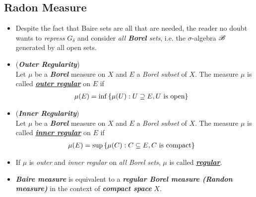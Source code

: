 \documentclass[11pt]{article}
\begin{document}
\subsection{Radon Measure}
\begin{itemize}
\item \begin{remark}
Despite the fact that Baire sets are all that are needed, the reader no doubt  wants to \emph{repress} $G_{\delta}$ and consider \emph{all \textbf{Borel} sets}, i.e. the $\sigma$-algebra ${\mathscr B}$ generated by  all open sets. 
\end{remark}

\item \begin{definition} (\emph{\textbf{Outer Regularity}}) \citep{folland2013real} \\
Let $\mu$ be a \textbf{\emph{Borel}} measure on $X$ and $E$ a \emph{Borel subset} of $X$. The measure $\mu$ is called \underline{\textbf{\emph{outer regular}}} on $E$  if
\begin{align*}
\mu(E) &= \inf\left\{\mu(U): U \supseteq E, U \text{ is open}\right\}
\end{align*}
\end{definition}

\item \begin{definition} (\emph{\textbf{Inner Regularity}}) \citep{folland2013real} \\
Let $\mu$ be a \textbf{\emph{Borel}} measure on $X$ and $E$ a \emph{Borel subset} of $X$. The measure $\mu$ is called \underline{\textbf{\emph{inner regular}}} on $E$  if
\begin{align*}
\mu(E) &= \sup\left\{\mu(C): C \subseteq E, C \text{ is compact}\right\}
\end{align*}
\end{definition}

\item \begin{definition}
If $\mu$ is \emph{outer} and \emph{inner regular} on \emph{all Borel sets}, $\mu$ is called \underline{\textbf{\emph{regular}}}. 
\end{definition}

\item \begin{remark}
\emph{\textbf{Baire measure}} is equivalent to a \emph{\textbf{regular Borel measure (Randon measure)}} in the context of \emph{\textbf{compact space}} $X$.
\end{remark}


\end{itemize}
\end{document}
